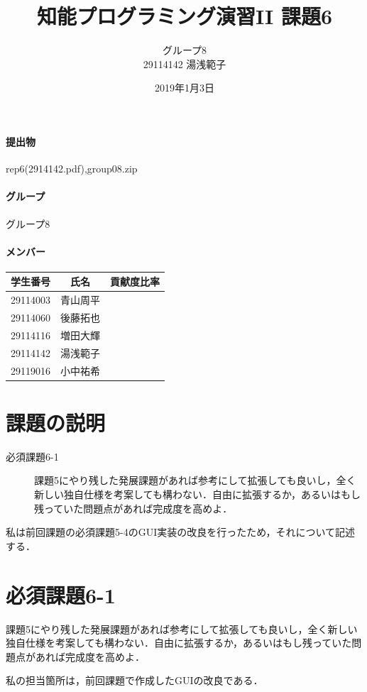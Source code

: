 \documentclass[12pt]{jarticle}
\title{知能プログラミング演習II 課題6}
\author{グループ8\\
  29114142 湯浅範子\\
}
\date{2019年1月3日}
\begin{document}
\maketitle

\paragraph{提出物} rep6(2914142.pdf),group08.zip
\paragraph{グループ} グループ8
\paragraph{メンバー}
\begin{tabular}{|c|c|c|}
  \hline
  学生番号&氏名&貢献度比率\\
  \hline\hline
  29114003&青山周平&\\
  \hline
  29114060&後藤拓也&\\
  \hline
  29114116&増田大輝&\\
  \hline
  29114142&湯浅範子&\\
  \hline
  29119016&小中祐希&\\
  \hline
\end{tabular}

\section{課題の説明}
\begin{description}
\item[必須課題6-1] 課題5にやり残した発展課題があれば参考にして拡張しても良いし，全く新しい独自仕様を考案しても構わない．自由に拡張するか，あるいはもし残っていた問題点があれば完成度を高めよ．
\end{description}
私は前回課題の必須課題5-4のGUI実装の改良を行ったため，それについて記述する．

\section{必須課題6-1}
\begin{screen}
  課題5にやり残した発展課題があれば参考にして拡張しても良いし，全く新しい独自仕様を考案しても構わない．自由に拡張するか，あるいはもし残っていた問題点があれば完成度を高めよ．
\end{screen}
私の担当箇所は，前回課題で作成したGUIの改良である．
\end{document}
